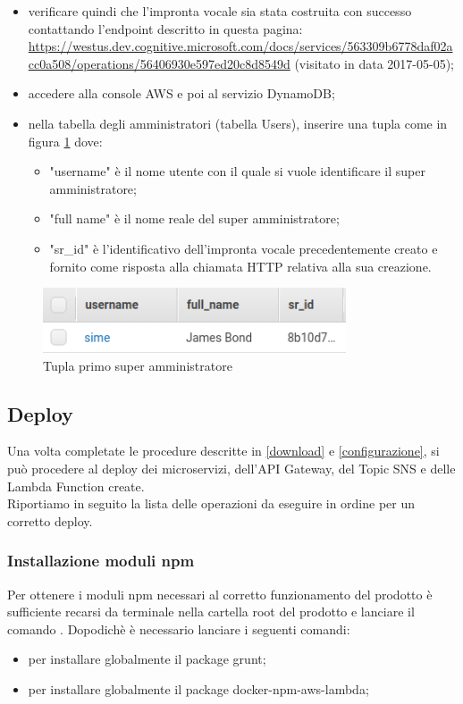 \begin{itemize}
	\item verificare quindi che l'impronta vocale sia stata costruita con successo contattando l'endpoint descritto in questa pagina:\\ \url{https://westus.dev.cognitive.microsoft.com/docs/services/563309b6778daf02acc0a508/operations/56406930e597ed20c8d8549d} (visitato in data 2017-05-05);
	\item accedere alla console AWS e poi al servizio DynamoDB;
	\item nella tabella degli amministratori (tabella Users), inserire una tupla come in figura \ref{fig:enradm} dove:
	\begin{itemize}
		\item "username" è il nome utente con il quale si vuole identificare il super amministratore;
		\item "full name" è il nome reale del super amministratore;
		\item "sr\_id" è l'identificativo dell'impronta vocale precedentemente creato e fornito come risposta alla chiamata HTTP relativa alla sua creazione.
	\end{itemize}
	
\end{itemize}

\begin{figure}[H]
	\centerline{\includegraphics[width=0.8\textwidth,height=\textheight,keepaspectratio]{sezioni/images/enradm.png}}
	\caption{Tupla primo super amministratore}\label{fig:enradm}
\end{figure}

\subsection{Deploy}\label{deploy}
Una volta completate le procedure descritte in \ref{download} e \ref{configurazione}, si può procedere al deploy dei microservizi, dell'API Gateway, del Topic SNS e delle Lambda Function create.\\Riportiamo in seguito la lista delle operazioni da eseguire in ordine per un corretto deploy.  

\subsubsection{Installazione moduli npm}\label{npm}
Per ottenere i moduli npm necessari al corretto funzionamento del prodotto è sufficiente recarsi da terminale nella cartella root del prodotto e lanciare il comando . Dopodichè è necessario lanciare i seguenti comandi:
\begin{itemize}
\item {} per installare globalmente il package grunt;
\item {} per installare globalmente il package docker-npm-aws-lambda;
\end{itemize}


